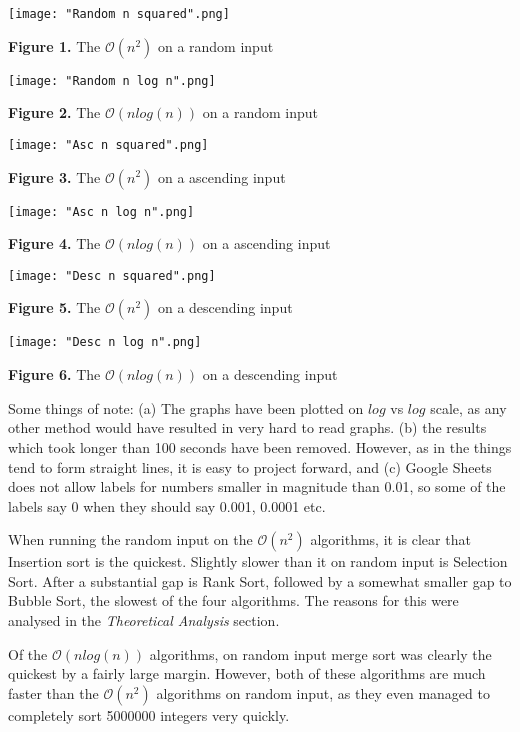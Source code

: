 \documentclass[12pt]{article}
\begin{document}
	\begin{center}
		\texttt{[image: "Random n squared".png]}
		
		\textbf{Figure 1.} The $ \mathcal{O} (n^2) $ on a random input
	
		\texttt{[image: "Random n log n".png]}
		
		\textbf{Figure 2.} The $ \mathcal{O} (n log (n)) $ on a random input
	
		\texttt{[image: "Asc n squared".png]}
		
		\textbf{Figure 3.} The $ \mathcal{O} (n^2) $ on a ascending input
	
		\texttt{[image: "Asc n log n".png]}
		
		\textbf{Figure 4.} The $ \mathcal{O} (n log (n)) $ on a ascending input
	
		\texttt{[image: "Desc n squared".png]}
		
		\textbf{Figure 5.} The $ \mathcal{O} (n^2) $ on a descending input
	
		\texttt{[image: "Desc n log n".png]}
		
		\textbf{Figure 6.} The $ \mathcal{O} (n log (n)) $ on a descending input
	\end{center}
	
	Some things of note: (a) The graphs have been plotted on $log$ vs $log$ scale, as any other method would have resulted in very hard to read graphs. (b) the results which took longer than 100 seconds have been removed. However, as in the things tend to form straight lines, it is easy to project forward, and (c) Google Sheets does not allow labels for numbers smaller in magnitude than 0.01, so some of the labels say 0 when they should say 0.001, 0.0001 etc.
	
	When running the random input on the $ \mathcal{O} (n^2) $ algorithms, it is clear that Insertion sort is the quickest. Slightly slower than it on random input is Selection Sort. After a substantial gap is Rank Sort, followed by a somewhat smaller gap to Bubble Sort, the slowest of the four algorithms. The reasons for this were analysed in the \textit{Theoretical Analysis} section.
	
	Of the $ \mathcal{O} (n log(n)) $ algorithms, on random input merge sort was clearly the quickest by a fairly large margin. However, both of these algorithms are much faster than the $ \mathcal{O} (n^2) $ algorithms on random input, as they even managed to completely sort 5000000 integers very quickly.
	
\end{document}
